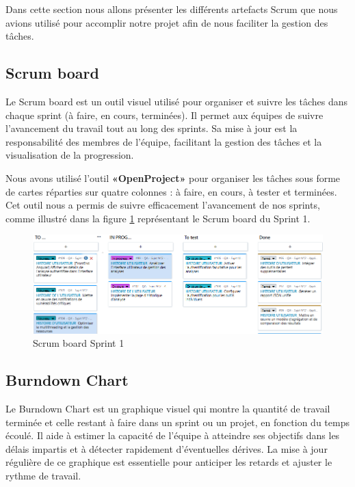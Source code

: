 Dans cette section nous allons présenter les différents artefacts Scrum que nous avions utilisé pour accomplir notre projet afin de nous faciliter la gestion des tâches. 
\subsection{Scrum board}
Le Scrum board est un outil visuel utilisé pour organiser et suivre les tâches dans chaque sprint (à faire, en cours, terminées). Il permet aux équipes de suivre l'avancement du travail tout au long des sprints. Sa mise à jour est la responsabilité des membres de l’équipe, facilitant la gestion des tâches et la visualisation de la progression\cite{Scrumboard}.

Nous avons utilisé l’outil \textbf{«OpenProject»} pour organiser les tâches sous forme de cartes réparties sur quatre colonnes : à faire, en cours, à tester et terminées. Cet outil nous a permis de suivre efficacement l'avancement de nos sprints, comme illustré dans la figure \ref{fig:boardOpenProject} représentant le Scrum board du Sprint 1.
\begin{figure}[H]
    \centering
    \includegraphics[width=\linewidth]{chapitres/ch2/img/board-sprit1.PNG}
    \caption{Scrum board Sprint 1}
    \label{fig:boardOpenProject}
\end{figure}
\vspace{-0.6cm}
\subsection{Burndown Chart}
Le Burndown Chart est un graphique visuel qui montre la quantité de travail terminée et celle restant à faire dans un sprint ou un projet, en fonction du temps écoulé. Il aide à estimer la capacité de l’équipe à atteindre ses objectifs dans les délais impartis et à détecter rapidement d’éventuelles dérives. La mise à jour régulière de ce graphique est essentielle pour anticiper les retards et ajuster le rythme de travail\cite{burndown}.

